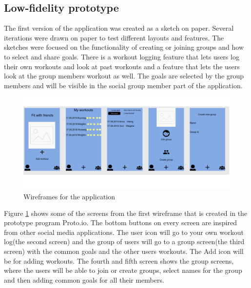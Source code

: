 \subsection{Low-fidelity prototype}\label{lowfi}
The first version of the application was created as a sketch on paper. Several iterations were drawn on paper to test different layouts and features. The sketches were focused on the functionality of creating or joining groups and how to select and share goals. There is a workout logging feature that lets users log their own workouts and look at past workouts and a feature that lets the users look at the group members workout as well. The goals are selected by the group members and will be visible in the social group member part of the application. 
\begin{figure}[H]
    \centering
    \includegraphics[width=120mm]{figures/testytestings.png}
    \caption{Wireframes for the application}
    \label{wireframe}
\end{figure}
Figure \ref{wireframe} shows some of the screens from the first wireframe that is created in the prototype program Proto.io. The bottom buttons on every screen are inspired from other social media applications. The user icon will go to your own workout log(the second screen) and the group of users will go to a group screen(the third screen) with the common goals and the other users workouts. The Add icon will be for adding workouts. The fourth and fifth screen shows the group screens, where the users will be able to join or create groups, select names for the group and then adding common goals for all their members.
